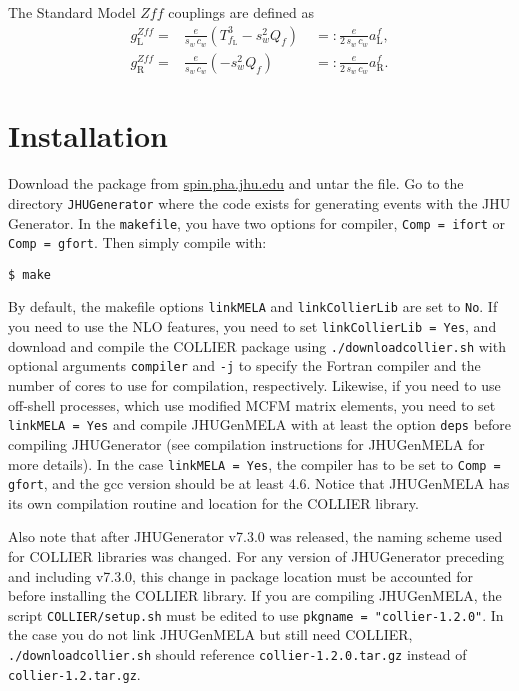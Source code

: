 \documentclass[aps,superscriptaddress,nofootinbib]{revtex4}
\begin{document}
The Standard Model $Zff$ couplings are defined as 
\begin{eqnarray}
	g_\mathrm{L}^{Zff} =& \frac{e}{s_w \,c_w} \left( T^3_{f_\mathrm{L}} - s_w^2 Q_f \right)  \; &=: \frac{e}{2\, s_w\, c_w} a_\mathrm{L}^f, \nonumber \\
	g_\mathrm{R}^{Zff} =& \frac{e}{s_w \,c_w} \left( - s_w^2 Q_f \right)  \; &=: \frac{e}{2\, s_w\, c_w} a_\mathrm{R}^f. 
	\label{eq:def:Zff}
\end{eqnarray}

\section{Installation}

\noindent
Download the package from \url{spin.pha.jhu.edu} and untar the file.  Go to the directory \verb|JHUGenerator| where the code exists for generating events with the JHU Generator. In the \verb|makefile|, you have two options for compiler, \verb|Comp = ifort| or \verb|Comp = gfort|.  Then simply compile with:
\begin{verbatim}
$ make
\end{verbatim}

By default, the makefile options \verb|linkMELA| and \verb|linkCollierLib| are set to \verb|No|. If you need to use the NLO features, you need to set \verb|linkCollierLib = Yes|, and download and compile the COLLIER package using \verb|./downloadcollier.sh| with optional arguments \verb|compiler| and \verb|-j| to specify the Fortran compiler and the number of cores to use for compilation, respectively. Likewise, if you need to use off-shell processes, which use modified MCFM matrix elements, you need to set \verb|linkMELA = Yes| and compile JHUGenMELA with at least the option \verb|deps| before compiling JHUGenerator (see compilation instructions for JHUGenMELA for more details). In the case \verb|linkMELA = Yes|, the compiler has to be set to \verb|Comp = gfort|, and the gcc version should be at least 4.6. Notice that JHUGenMELA has its own compilation routine and location for the COLLIER library.

Also note that after JHUGenerator v7.3.0 was released, the naming scheme used for COLLIER libraries was changed. For any version of JHUGenerator preceding and including v7.3.0, this change in package location must be accounted for before installing the COLLIER library. If you are compiling JHUGenMELA, the script \verb|COLLIER/setup.sh| must be edited to use \verb|pkgname = "collier-1.2.0"|. In the case you do not link JHUGenMELA but still need COLLIER, \verb|./downloadcollier.sh| should reference \verb|collier-1.2.0.tar.gz| instead of \verb|collier-1.2.tar.gz|.
\end{document}
